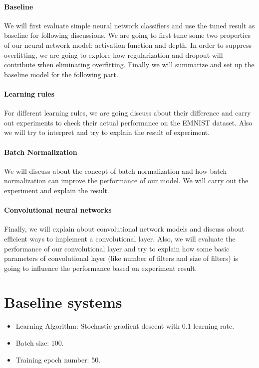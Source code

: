 \documentclass{article}
\begin{document}
\paragraph{Baseline}
We  will first evaluate simple neural network classifiers and use the tuned result as baseline for following discussions. We are going to first tune some two properties of our neural network model: activation function and depth. In order to suppress overfitting, we are going to explore how regularization and dropout will contribute when eliminating overfitting. Finally we will summarize and set up the baseline model for the following part.

\paragraph{Learning rules}
For different learning rules, we are going discuss about their difference and  carry out experiments to check their actual performance on the EMNIST dataset. Also we will try to interpret and try to explain the result of experiment.

\paragraph{Batch Normalization}
 We will discuss about the concept of batch normalization and how batch normalization can improve the performance of our model. We will carry out the experiment and explain the result.
 \paragraph{Convolutional neural networks}
 Finally, we will explain about convolutional network models and discuss about efficient ways to implement a convolutional layer. Also, we will evaluate the performance of our convolutional layer and try to explain how some basic parameters of convolutional layer (like number of filters and size of filters) is going to influence the performance based on experiment result.








\section{Baseline systems} 
\begin{itemize}
	\item Learning Algorithm: Stochastic gradient descent with 0.1 learning rate.
	\item Batch size: 100.
	\item Training epoch number: 50.
\end{itemize}
\end{document}
